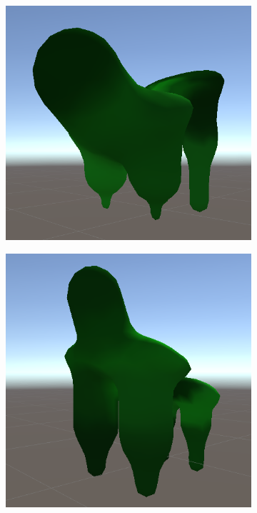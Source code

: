 \begin{figure}[ht]
\begin{subfigure}[b]{0.2\textwidth}
    \end{subfigure}
    \begin{subfigure}[b]{0.2\textwidth}
        \centering
        \includegraphics[width=\textwidth, height=\textwidth]{resources/img/Finished_Creatures_4/creature_9}
    \end{subfigure}
    \begin{subfigure}[b]{0.2\textwidth}
        \centering
        \includegraphics[width=\textwidth, height=\textwidth]{resources/img/Finished_Creatures_4/creature_10}

\end{subfigure}
\end{figure}
